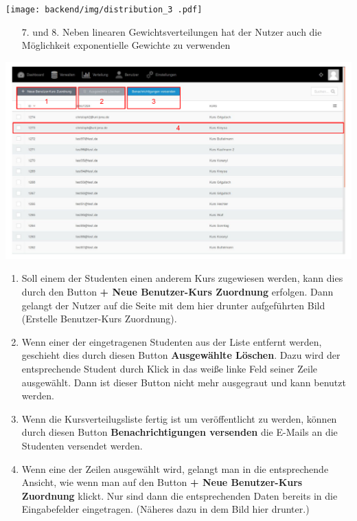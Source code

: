   \texttt{[image: backend/img/distribution\_3 .pdf]}
  \begin{enumerate}
   \item[7. und 8.] Neben linearen Gewichtsverteilungen hat der Nutzer auch die Möglichkeit exponentielle Gewichte zu verwenden
  \end{enumerate}

  \includegraphics[scale=0.3]{backend/img/distribution_4.pdf}
  \begin{enumerate}
   \item Soll einem der Studenten einen anderem Kurs zugewiesen werden, kann dies durch den Button \textbf{+ Neue Benutzer-Kurs Zuordnung} erfolgen.
	 Dann gelangt der Nutzer auf die Seite mit dem hier drunter aufgeführten Bild (Erstelle Benutzer-Kurs Zuordnung).
   \item Wenn einer der eingetragenen Studenten aus der Liste entfernt werden, geschieht dies durch diesen Button \textbf{Ausgewählte Löschen}.
	 Dazu wird der entsprechende Student durch Klick in das weiße linke Feld seiner Zeile ausgewählt.
	 Dann ist dieser Button nicht mehr ausgegraut und kann benutzt werden.
   \item Wenn die Kursverteilugsliste fertig ist um veröffentlicht zu werden, 
	 können durch diesen Button \textbf{Benachrichtigungen versenden} die E-Mails an die Studenten versendet werden.
   \item Wenn eine der Zeilen ausgewählt wird, gelangt man in die entsprechende Ansicht, wie wenn man auf den Button \textbf{+ Neue Benutzer-Kurs Zuordnung} klickt.
	 Nur sind dann die entsprechenden Daten bereits in die Eingabefelder eingetragen. (Näheres dazu in dem Bild hier drunter.)
  \end{enumerate}

